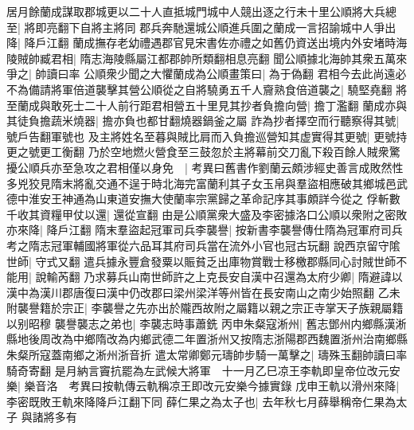 居月餘蘭成謀取郡城更以二十人直抵城門城中人競出逐之行未十里公順將大兵總至|{
	將即亮翻下自將主將同}
郡兵奔馳還城公順進兵圍之蘭成一言招諭城中人爭出降|{
	降戶江翻}
蘭成撫存老幼禮遇郡官見宋書佐亦禮之如舊仍資送出境内外安堵時海陵賊帥臧君相|{
	隋志海陵縣屬江都郡帥所類翻相息亮翻}
聞公順據北海帥其衆五萬來爭之|{
	帥讀曰率}
公順衆少聞之大懼蘭成為公順畫策曰|{
	為于偽翻}
君相今去此尚遠必不為備請將軍倍道襲擊其營公順從之自將驍勇五千人齎熟食倍道襲之|{
	驍堅堯翻}
將至蘭成與敢死士二十人前行距君相營五十里見其抄者負擔向營|{
	擔丁濫翻}
蘭成亦與其徒負擔蔬米燒器|{
	擔亦負也都甘翻燒器鍋釜之屬}
詐為抄者擇空而行聽察得其號|{
	號戶告翻軍號也}
及主將姓名至暮與賊比肩而入負擔巡營知其虚實得其更號|{
	更號持更之號更工衡翻}
乃於空地燃火營食至三鼓忽於主將幕前交刀亂下殺百餘人賊衆驚擾公順兵亦至急攻之君相僅以身免　|{
	考異曰舊書作劉蘭云頗涉經史善言成敗然性多兇狡見隋末將亂交通不逞于時北海完富蘭利其子女玉帛與羣盜相應破其鄉城邑武德中淮安王神通為山東道安撫大使蘭率宗黨歸之革命記序其事頗詳今從之}
俘斬數千收其資糧甲仗以還|{
	還從宣翻}
由是公順黨衆大盛及李密據洛口公順以衆附之密敗亦來降|{
	降戶江翻}
隋末羣盜起冠軍司兵李襲譽|{
	按新書李襲譽傳仕隋為冠軍府司兵考之隋志冠軍輔國將軍從六品耳其府司兵當在流外小官也冠古玩翻}
說西京留守隂世師|{
	守式又翻}
遣兵據永豐倉發粟以賑貧乏出庫物賞戰士移檄郡縣同心討賊世師不能用|{
	說輸芮翻}
乃求募兵山南世師許之上克長安自漢中召還為太府少卿|{
	隋避諱以漢中為漢川郡唐復曰漢中仍改郡曰梁州梁洋等州皆在長安南山之南少始照翻}
乙未附襲譽籍於宗正|{
	李襲譽之先亦出於隴西故附之屬籍以親之宗正寺掌天子族親屬籍以别昭穆}
襲譽襲志之弟也|{
	李襲志時事蕭銑}
丙申朱粲寇淅州|{
	舊志鄧州内鄉縣漢淅縣地後周改為中鄉隋改為内鄉武德二年置浙州又按隋志浙陽郡西魏置浙州治南鄉縣朱粲所寇蓋南鄉之淅州浙音折}
遣太常卿鄭元璹帥步騎一萬擊之|{
	璹殊玉翻帥讀曰率騎奇寄翻}
是月納言竇抗罷為左武候大將軍　十一月乙巳凉王李軌即皇帝位改元安樂|{
	樂音洛　考異曰按軌傳云軌稱凉王即改元安樂今據實錄}
戊申王軌以滑州來降|{
	李密既敗王軌來降降戶江翻下同}
薛仁果之為太子也|{
	去年秋七月薛舉稱帝仁果為太子}
與諸將多有

